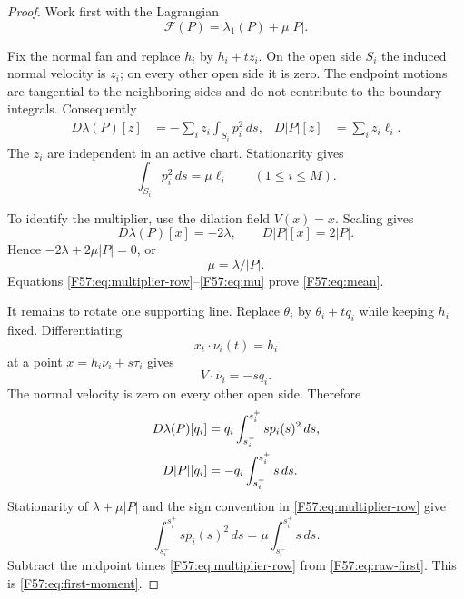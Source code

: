 \documentclass[11pt]{amsart}
\numberwithin{equation}{section}
\theoremstyle{definition}
\theoremstyle{remark}
\begin{document}
\begin{proof}
Work first with the Lagrangian
\begin{equation}
 \mathcal F(P)=\lambda_1(P)+\mu |P|.
\end{equation}

Fix the normal fan and replace $h_i$ by $h_i+t z_i$.  On the open side
$S_i$ the induced normal velocity is $z_i$; on every other open side it is
zero.  The endpoint motions are tangential to the neighboring sides and do
not contribute to the boundary integrals.  Consequently
\begin{align}
 D\lambda(P)[z]&=-\sum_i z_i\int_{S_i}p_i^2\,ds,
 &D|P|[z]&=\sum_i z_i\ell_i.
\end{align}
The $z_i$ are independent in an active chart.  Stationarity gives
\begin{equation}\label{F57:eq:multiplier-row}
 \int_{S_i}p_i^2\,ds=\mu\ell_i
 \qquad(1\le i\le M).
\end{equation}

To identify the multiplier, use the dilation field $V(x)=x$.  Scaling gives
\begin{equation}
 D\lambda(P)[x]=-2\lambda,\qquad D|P|[x]=2|P|.
\end{equation}
Hence $-2\lambda+2\mu|P|=0$, or
\begin{equation}\label{F57:eq:mu}
 \mu=\lambda/|P|.
\end{equation}
Equations \eqref{F57:eq:multiplier-row}--\eqref{F57:eq:mu} prove
\eqref{F57:eq:mean}.

It remains to rotate one supporting line.  Replace
$\theta_i$ by $\theta_i+tq_i$ while keeping $h_i$ fixed.  Differentiating
\begin{equation}
 x_t\cdot\nu_i(t)=h_i
\end{equation}
at a point $x=h_i\nu_i+s\tau_i$ gives
\begin{equation}\label{F57:eq:rot-velocity}
 V\cdot\nu_i=-s q_i.
\end{equation}
The normal velocity is zero on every other open side.  Therefore
\begin{align}
 D\lambda(P)[q_i]
 &=q_i\int_{s_i^-}^{s_i^+}s p_i(s)^2\,ds,\notag\\
 D|P|[q_i]
 &=-q_i\int_{s_i^-}^{s_i^+}s\,ds.
\end{align}
Stationarity of $\lambda+\mu|P|$ and the sign convention in
\eqref{F57:eq:multiplier-row} give
\begin{equation}\label{F57:eq:raw-first}
 \int_{s_i^-}^{s_i^+}s p_i(s)^2\,ds
 =\mu\int_{s_i^-}^{s_i^+}s\,ds.
\end{equation}
Subtract the midpoint times \eqref{F57:eq:multiplier-row} from
\eqref{F57:eq:raw-first}.  This is \eqref{F57:eq:first-moment}.
\end{proof}
\end{document}
